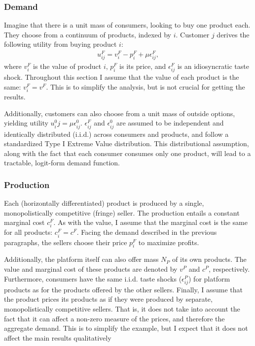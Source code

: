 \documentclass[a4paper]{article}
\begin{document}
\subsubsection{Demand}

Imagine that there is a unit mass of consumers, looking to buy one product each.
They choose from a continuum of products, indexed by $i$.
Customer $j$ derives the following utility from buying product $i$:
\begin{align*}
    u^F_{ij} = v^F_i - p^F_i + \mu\epsilon^F_{ij},
\end{align*}
where $v^F_i$ is the value of product $i$, $p^F_i$ is its price, and $\epsilon^F_{ij}$ is an idiosyncratic taste shock.
Throughout this section I assume that the value of each product is the same: $v^F_i = v^F$.
This is to simplify the analysis, but is not crucial for getting the results.  %

Additionally, customers can also choose from a unit mass of outside options, yielding utility $u^0_ij = \mu\epsilon^0_{ij}$. $\epsilon^F_{ij}$ and $\epsilon^0_{ij}$ are assumed to be independent and identically distributed (i.i.d.) across consumers and products, and follow a standardized Type I Extreme Value distribution. This distributional assumption, along with the fact that each consumer consumes only one product, will lead to a tractable, logit-form demand function.

\subsubsection{Production}

Each (horizontally differentiated) product is produced by a single, monopolistically competitive (fringe) seller.
The production entails a constant marginal cost $c^F_i$.
As with the value, I assume that the marginal cost is the same for all products: $c^F_i = c^F$.
Facing the demand described in the previous paragraphs, the sellers choose their price $p^F_i$ to maximize profits.

Additionally, the platform itself can also offer mass $N_P$ of its own products.
The value and marginal cost of these products are denoted by $v^P$ and $c^P$, respectively.
Furthermore, consumers have the same i.i.d. taste shocks ($\epsilon^P_{ij}$) for platform products as for the products offered by the other sellers.
Finally, I assume that the product prices its products as if they were produced by separate, monopolistically competitive sellers.
That is, it does not take into account the fact that it can affect a non-zero measure of the prices, and therefore the aggregate demand.
This is to simplify the example, but I expect that it does not affect the main results qualitatively
\end{document}
